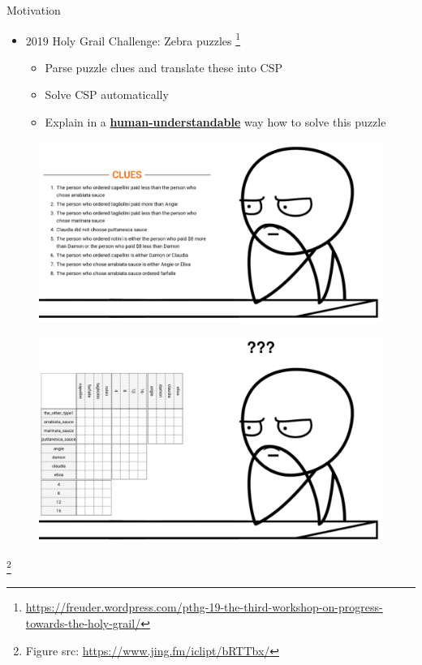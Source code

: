 \documentclass[handout]{beamer}
\begin{document}
\begin{frame}{Motivation}
    \begin{itemize}
        \item 2019 Holy Grail Challenge: Zebra puzzles \footnote{\tiny\url{https://freuder.wordpress.com/pthg-19-the-third-workshop-on-progress-towards-the-holy-grail/}}
              \begin{itemize}
                  \item Parse puzzle clues and translate these into CSP
                  \item Solve CSP automatically
                  \item Explain in a \textbf{\underline{human-understandable}} way how to solve this puzzle
              \end{itemize}
    \end{itemize}
    \begin{minipage}[t]{0.48\linewidth}
        \centering
        \vspace{0.46cm}
        \begin{figure}[h]
            \includegraphics[width=\textwidth]{figures/meme_clues}
            \label{clues}
        \end{figure}
    \end{minipage}\hfill
    \begin{minipage}[t]{0.48\linewidth}
        \centering
        \begin{figure}[h]
            \includegraphics[width=\textwidth]{figures/meme}
            \label{grid}
        \end{figure}

    \end{minipage}
    \footnote{\tiny Figure src: \url{https://www.jing.fm/iclipt/bRTTbx/}}
\end{frame}
\end{document}
